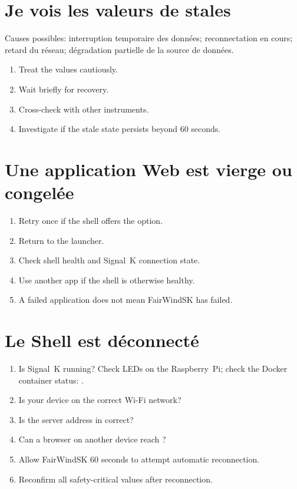 \section{Je vois les valeurs de stales}

Causes possibles: interruption temporaire des données; reconnectation en cours; retard du réseau;
dégradation partielle de la source de données.

\begin{enumerate}
  \item Treat the values cautiously.
  \item Wait briefly for recovery.
  \item Cross-check with other instruments.
  \item Investigate if the stale state persists beyond 60 seconds.
\end{enumerate}

\section{Une application Web est vierge ou congelée}

\begin{enumerate}
  \item Retry once if the shell offers the option.
  \item Return to the launcher.
  \item Check shell health and Signal~K connection state.
  \item Use another app if the shell is otherwise healthy.
  \item A failed application does not mean FairWindSK has failed.
\end{enumerate}

\section{Le Shell est déconnecté}

\begin{enumerate}
  \item Is Signal~K running? Check LEDs on the Raspberry~Pi; check the Docker
        container status: .
  \item Is your device on the correct Wi-Fi network?
  \item Is the server address in  correct?
  \item Can a browser on another device reach ?
  \item Allow FairWindSK 60 seconds to attempt automatic reconnection.
  \item Reconfirm all safety-critical values after reconnection.
\end{enumerate}

